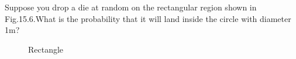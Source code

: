 Suppose you drop a die at random on the rectangular region shown in Fig.15.6.What is the probability that it will land inside the circle with diameter 1m?
\begin{figure}[ht!]
\begin{center}
			\resizebox{\columnwidth}{!}{}
	\end{center}
	\caption{Rectangle}
	\label{fig:rec}	
\end{figure}

